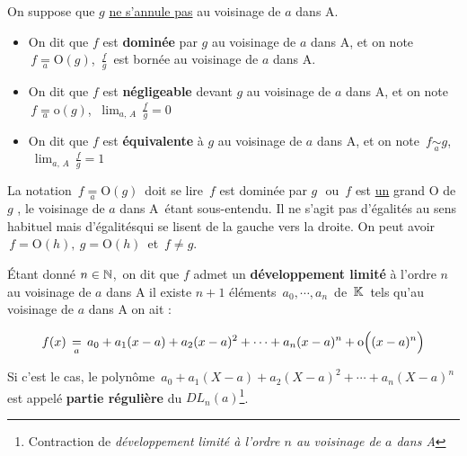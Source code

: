 \noindent On suppose que $g$ \underline{ne s'annule pas} au voisinage de $a$ dans A.
\begin{itemize}[label=•]
    \item On dit que $f$ est \textbf{dominée} par $g$ au voisinage de $a$ dans A, et on note \(\,f\underset{a}{=}\mathrm{O}(g)\), \ssi \(\displaystyle\,\frac{f}{g}\,\) est bornée au voisinage de $a$ dans A.\vspace{0.2cm}
    
    \item On dit que $f$ est \textbf{négligeable} devant $g$ au voisinage de $a$ dans A, et on note \(\,f\underset{a}{=}\mathrm{o}(g)\), \ssi \(\ \displaystyle \lim_{a,\,A}\,\frac{f}{g}=0\)\vspace{0.2cm}
    
    \item On dit que $f$ est \textbf{équivalente} à $g$ au voisinage de $a$ dans A, et on note \(\,f \underset{a}{\sim}g\),\, \ssi \(\ \displaystyle \lim_{a,\,A}\, \frac{f}{g}=1\)
\end{itemize}
\vspace{0.3cm}
\begin{small}
    \noindent La notation \(\,f\underset{a}{=}\mathrm{O}(g)\,\) doit se lire \guillemetleft $\,f$ est dominée par $g\,$\guillemetright\, ou \guillemetleft $\,f$ est \underline{un} grand O de $g\,$\guillemetright\,, le \guillemetleft voisinage de $a$ dans A\guillemetright\, étant sous-entendu. Il ne s'agit pas d'égalités au sens habituel mais \guillemetleft d'égalités\guillemetright\;qui se lisent de la gauche vers la droite. On peut avoir \(\,f=\mathrm{O}(h),\ g=\mathrm{O}(h)\,\) et \(\,f\neq g\).
\end{small}

\vspace{1.2cm}

Étant donné \(n\in\mathbb{N}\),\, on dit que $f$ admet un \textbf{développement limité} à l'ordre $n$ au voisinage de $a$ dans A \ssi il existe $n+1$ éléments \(\, a_0,\cdots,a_n\,\) de \(\,\mathbb{K}\,\) tels qu'au voisinage de $a$ dans A on ait :\vspace{-0.3cm}

\[f(x)\,\underset{a}{=}\,a_0+a_1(x-a)+a_2(x-a)^2+\cdots+a_n(x-a)^n+\mathrm{o}\Bigl((x-a)^n\Bigr)\]

Si c'est le cas, le polynôme \(\,a_0+a_1(X-a)+a_2(X-a)^2+\cdots+a_n(X-a)^n\,\) est appelé \textbf{partie régulière} du $DL_n(a)$\footnote{Contraction de \textit{développement limité à l'ordre $n$ au voisinage de $a$ dans A}}.

